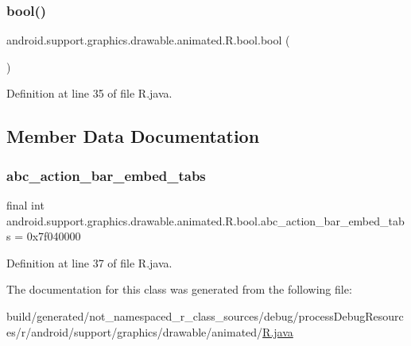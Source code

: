 \subsubsection{\texorpdfstring{bool()}{bool()}}
{\footnotesize\ttfamily android.\+support.\+graphics.\+drawable.\+animated.\+R.\+bool.\+bool (\begin{DoxyParamCaption}{ }\end{DoxyParamCaption})\hspace{0.3cm}{\ttfamily [private]}}



Definition at line 35 of file R.\+java.


\begin{DoxyCode}{0}

\end{DoxyCode}


\subsection{Member Data Documentation}
\mbox{\label{classandroid_1_1support_1_1graphics_1_1drawable_1_1animated_1_1_r_1_1bool_aa72a93d23c6382aab7e3917f72025bc7}} 
\subsubsection{\texorpdfstring{abc\_action\_bar\_embed\_tabs}{abc\_action\_bar\_embed\_tabs}}
{\footnotesize\ttfamily final int android.\+support.\+graphics.\+drawable.\+animated.\+R.\+bool.\+abc\+\_\+action\+\_\+bar\+\_\+embed\+\_\+tabs = 0x7f040000\hspace{0.3cm}{\ttfamily [static]}}



Definition at line 37 of file R.\+java.



The documentation for this class was generated from the following file\+:\begin{DoxyCompactItemize}
\item 
build/generated/not\+\_\+namespaced\+\_\+r\+\_\+class\+\_\+sources/debug/process\+Debug\+Resources/r/android/support/graphics/drawable/animated/\mbox{\hyperlink{android_2support_2graphics_2drawable_2animated_2_r_8java}{R.\+java}}\end{DoxyCompactItemize}
